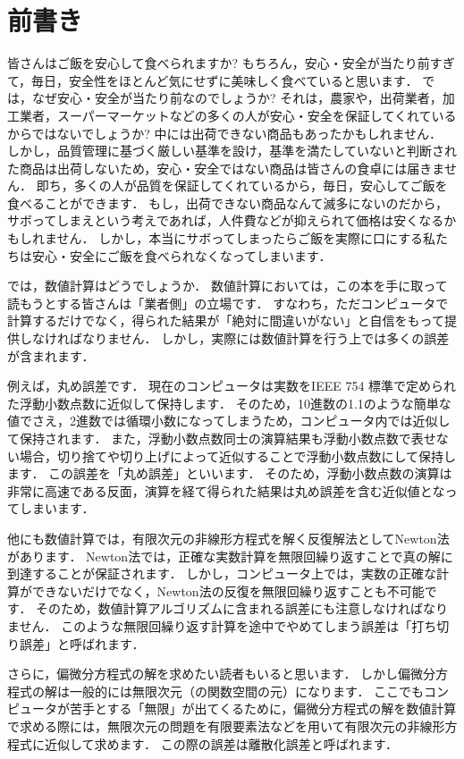 \documentclass[paper=a5,fontsize=10pt,book]{jlreq}
\begin{document}
\chapter*{前書き}
皆さんはご飯を安心して食べられますか?
もちろん，安心・安全が当たり前すぎて，毎日，安全性をほとんど気にせずに美味しく食べていると思います．
では，なぜ安心・安全が当たり前なのでしょうか?
それは，農家や，出荷業者，加工業者，スーパーマーケットなどの多くの人が安心・安全を保証してくれているからではないでしょうか?
中には出荷できない商品もあったかもしれません．
しかし，品質管理に基づく厳しい基準を設け，基準を満たしていないと判断された商品は出荷しないため，安心・安全ではない商品は皆さんの食卓には届きません．
即ち，多くの人が品質を保証してくれているから，毎日，安心してご飯を食べることができます．
もし，出荷できない商品なんて滅多にないのだから，サボってしまえという考えであれば，人件費などが抑えられて価格は安くなるかもしれません．
しかし，本当にサボってしまったらご飯を実際に口にする私たちは安心・安全にご飯を食べられなくなってしまいます．


では，数値計算はどうでしょうか．
数値計算においては，この本を手に取って読もうとする皆さんは「業者側」の立場です．
すなわち，ただコンピュータで計算するだけでなく，得られた結果が「絶対に間違いがない」と自信をもって提供しなければなりません．
しかし，実際には数値計算を行う上では多くの誤差が含まれます．


例えば，丸め誤差です．
現在のコンピュータは実数をIEEE 754 標準で定められた浮動小数点数に近似して保持します．
そのため，10進数の1.1のような簡単な値でさえ，2進数では循環小数になってしまうため，コンピュータ内では近似して保持されます．
また，浮動小数点数同士の演算結果も浮動小数点数で表せない場合，切り捨てや切り上げによって近似することで浮動小数点数にして保持します．
この誤差を「丸め誤差」といいます．
そのため，浮動小数点数の演算は非常に高速である反面，演算を経て得られた結果は丸め誤差を含む近似値となってしまいます．


他にも数値計算では，有限次元の非線形方程式を解く反復解法としてNewton法があります．
Newton法では，正確な実数計算を無限回繰り返すことで真の解に到達することが保証されます．
しかし，コンピュータ上では，実数の正確な計算ができないだけでなく，Newton法の反復を無限回繰り返すことも不可能です．
そのため，数値計算アルゴリズムに含まれる誤差にも注意しなければなりません．
このような無限回繰り返す計算を途中でやめてしまう誤差は「打ち切り誤差」と呼ばれます．


さらに，偏微分方程式の解を求めたい読者もいると思います．
しかし偏微分方程式の解は一般的には無限次元（の関数空間の元）になります．
ここでもコンピュータが苦手とする「無限」が出てくるために，偏微分方程式の解を数値計算で求める際には，無限次元の問題を有限要素法などを用いて有限次元の非線形方程式に近似して求めます．
この際の誤差は離散化誤差と呼ばれます．
\end{document}
